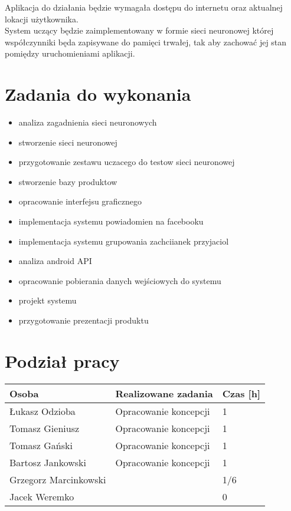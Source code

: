\documentclass[a4paper,twoside,11pt]{article}
\begin{document}
Aplikacja do działania będzie wymagała dostępu do internetu oraz aktualnej lokacji użytkownika. \\

System uczący będzie zaimplementowany w formie sieci neuronowej której współczynniki będa zapisywane do pamięci trwałej, tak aby zachować jej stan pomiędzy uruchomieniami aplikacji.

\section{Zadania do wykonania}
\begin{itemize}
\item analiza zagadnienia sieci neuronowych
\item stworzenie sieci neuronowej
\item przygotowanie zestawu uczacego do testow sieci neuronowej
\item stworzenie bazy produktow
\item opracowanie interfejsu graficznego
\item implementacja systemu powiadomien na facebooku
\item implementacja systemu grupowania zachciianek przyjaciol
\item analiza android API
\item opracowanie pobierania danych wejściowych do systemu
\item projekt systemu
\item przygotowanie prezentacji produktu
\end{itemize}

\section{Podział pracy}
\begin{center}
\begin{tabular}{|l|p{11cm}|l|}
  \hline 
  Osoba & Realizowane zadania & Czas [h]\\
  \hline
  Łukasz Odzioba & Opracowanie koncepcji & 1 \\
 \hline
  Tomasz Gieniusz & Opracowanie koncepcji & 1 \\
 \hline
  Tomasz Gański & Opracowanie koncepcji & 1 \\
 \hline 
  Bartosz Jankowski & Opracowanie koncepcji & 1 \\
 \hline
  Grzegorz Marcinkowski &  & 1/6 \\
 \hline
  Jacek Weremko &  & 0 \\
 \hline
\end{tabular} 
\end{center}
\end{document}
